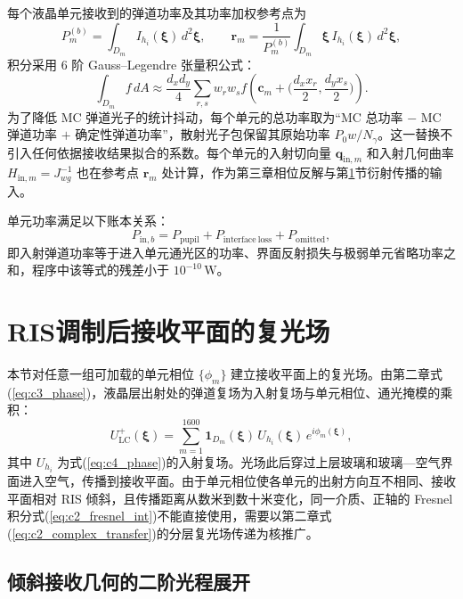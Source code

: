 每个液晶单元接收到的弹道功率及其功率加权参考点为
\begin{equation}
P_m^{(b)}=\int_{D_m}I_{h_i}(\boldsymbol\xi)\,d^2\boldsymbol\xi,\qquad
\mathbf r_m=\frac{1}{P_m^{(b)}}\int_{D_m}\boldsymbol\xi\,I_{h_i}(\boldsymbol\xi)\,d^2\boldsymbol\xi,
\label{eq:c4_unit}
\end{equation}
积分采用 6 阶 Gauss--Legendre 张量积公式：
\begin{equation}
\int_{D_m}f\,dA\approx\frac{d_xd_y}{4}\sum_{r,s}w_rw_sf\!\left(\mathbf c_m+\Big(\frac{d_xx_r}{2},\frac{d_yx_s}{2}\Big)\right).
\label{eq:c4_gl}
\end{equation}
为了降低 MC 弹道光子的统计抖动，每个单元的总功率取为“MC 总功率 $-$ MC 弹道功率 $+$ 确定性弹道功率”，散射光子包保留其原始功率 $P_0w/N_\gamma$。这一替换不引入任何依据接收结果拟合的系数。每个单元的入射切向量 $\mathbf q_{\mathrm{in},m}$ 和入射几何曲率 $H_{\mathrm{in},m}=J_{wg}^{-1}$ 也在参考点 $\mathbf r_m$ 处计算，作为第三章相位反解与第\ref{sec:c4_rx_field}节衍射传播的输入。

单元功率满足以下账本关系：
\begin{equation}
P_{\mathrm{in},b}=P_{\mathrm{pupil}}+P_{\mathrm{interface\ loss}}+P_{\mathrm{omitted}},
\label{eq:c4_ledger}
\end{equation}
即入射弹道功率等于进入单元通光区的功率、界面反射损失与极弱单元省略功率之和，程序中该等式的残差小于 $10^{-10}\,\mathrm W$。

\section{RIS调制后接收平面的复光场}
\label{sec:c4_rx_field}

本节对任意一组可加载的单元相位 $\{\phi_m\}$ 建立接收平面上的复光场。由第二章式(\ref{eq:c3_phase})，液晶层出射处的弹道复场为入射复场与单元相位、通光掩模的乘积：
\begin{equation}
U^{+}_{\mathrm{LC}}(\boldsymbol\xi)=\sum_{m=1}^{1600}\mathbf 1_{D_m}(\boldsymbol\xi)\,U_{h_i}(\boldsymbol\xi)\,e^{i\phi_m(\boldsymbol\xi)},
\label{eq:c4_lc_exit}
\end{equation}
其中 $U_{h_i}$ 为式(\ref{eq:c4_phase})的入射复场。光场此后穿过上层玻璃和玻璃—空气界面进入空气，传播到接收平面。由于单元相位使各单元的出射方向互不相同、接收平面相对 RIS 倾斜，且传播距离从数米到数十米变化，同一介质、正轴的 Fresnel 积分式(\ref{eq:c2_fresnel_int})不能直接使用，需要以第二章式(\ref{eq:c2_complex_transfer})的分层复光场传递为核推广。

\subsection{倾斜接收几何的二阶光程展开}

